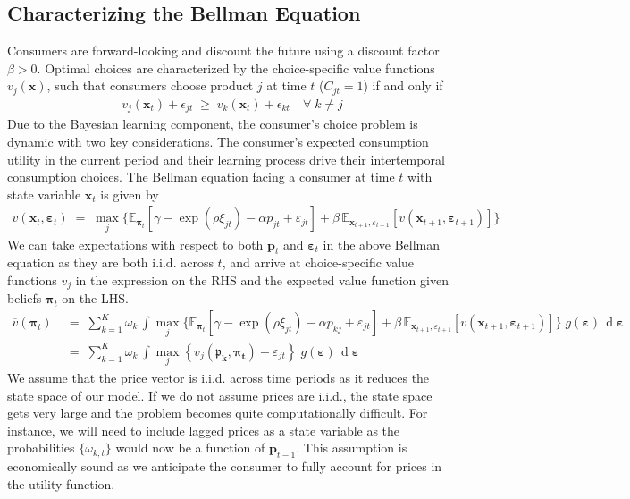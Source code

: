 \documentclass[11pt]{article}
\newcommand{\E}{\mathbb{E}}
\begin{document}
\subsection*{Characterizing the Bellman Equation}
Consumers are forward-looking and discount the future using a discount factor $\beta>0 .$ Optimal choices are characterized by the choice-specific value functions $v_{j}(\boldsymbol{x})$, such that consumers choose product $j$ at time $t$ ($C_{jt} = 1$) if and only if 
\begin{gather*}
    v_{j}\left(\boldsymbol{x}_{t}\right)+\epsilon_{jt} \; \geq \;  v_{k}\left(\boldsymbol{x}_{t}\right)+\epsilon_{k t} \quad \forall \; k \neq j
\end{gather*}
Due to the Bayesian learning component, the consumer's choice problem is dynamic with two key considerations. The consumer's expected consumption utility in the current period and their learning process drive their intertemporal consumption choices. The Bellman equation facing a consumer at time $t$ with state variable $\boldsymbol{x}_t$ is given by
\begin{gather*}
    v\left(\boldsymbol{x}_{t}, \boldsymbol{\varepsilon}_{t}\right) \; = \; \max _{j}  \Big\{ \E_{{\boldsymbol{\pi}_{t}}}\left[\gamma-\exp \left(\rho \xi_{j t}\right)-\alpha p_{j t}+\varepsilon_{j t} \right]+ \beta \, \E_{\boldsymbol{x}_{t+1}, \varepsilon_{t+1}} \left[ v \left(\boldsymbol{x}_{t+1}, \boldsymbol{\varepsilon}_{t+1}\right)  \right] \Big\}
\end{gather*}
We can take expectations with respect to both $\boldsymbol{p}_t$ and $\boldsymbol{\varepsilon}_t$ in the above Bellman equation as they are both i.i.d. across $t$, and arrive at choice-specific value functions $v_j$ in the expression on the RHS and the expected value function given beliefs $\boldsymbol{\pi}_t$ on the LHS.
\begin{align*}
\overline{v}(\boldsymbol{\pi}_t) \; &= \; \sum_{k=1}^K \omega_k \, \int \max_j  \Big\{ \E_{{\boldsymbol{\pi}_{t}}}\left[\gamma-\exp \left(\rho \xi_{j t}\right)-\alpha p_{kj}+\varepsilon_{j t} \right]+ \beta \, \E_{\boldsymbol{x}_{t+1}, \varepsilon_{t+1}} \left[ v \left(\boldsymbol{x}_{t+1}, \boldsymbol{\varepsilon}_{t+1}\right)  \right] \Big\} \; g(\boldsymbol\varepsilon) \,\operatorname{d}\boldsymbol\varepsilon \\
& = \;  \sum_{k=1}^K \omega_k \, \int \max_j  \left\{ v_j(\mathbf{\boldsymbol{\mathfrak{p}}_k, \boldsymbol{\pi}_t}) +  \varepsilon_{j t} \right\} \; g(\boldsymbol\varepsilon) \,\operatorname{d}\boldsymbol\varepsilon
\end{align*}
We assume that the price vector is i.i.d. across time periods as it reduces the state space of our model. If we do not assume prices are i.i.d., the state space gets very large and the problem becomes quite computationally difficult. For instance, we will need to include lagged prices as a state variable as the probabilities $\{\omega_{k,t}\}$ would now be a function of $\boldsymbol{p}_{t-1}$. This assumption is economically sound as we anticipate the consumer to fully account for prices in the utility function.\\
\end{document}
